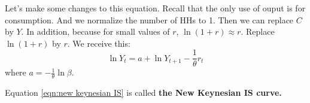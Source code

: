 \documentclass[12pt]{article}
\begin{document}
Let's make some changes to this equation. Recall that the only use of ouput is for
consumption. And we normalize the number of HHs to 1. Then we can replace $ C $ by
$ Y $. In addition, because for small values of $ r $, $ \ln (1 + r)\approx r $. 
Replace $ \ln (1 + r) $ by $ r $. We receive this:
\begin{equation}
		\label{eqn:new keynesian IS}
\ln Y_{t} = a + \ln Y_{t + 1} - \frac{1}{\theta}r_{t}
\end{equation}
where $ a =  - \frac{1}{\theta}\ln \beta $.

Equation \eqref{eqn:new keynesian IS} is called {\textbf {the New Keynesian IS curve.}}









\end{document}
